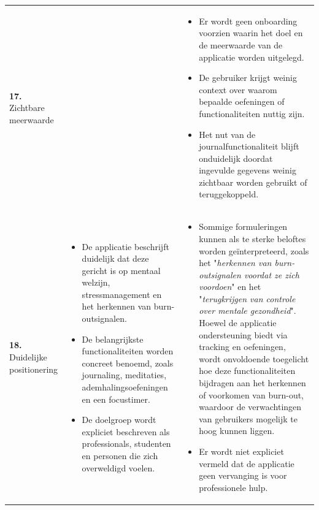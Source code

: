 {\begin{longtable}{
            >{\raggedright\arraybackslash}p{5.23cm}
            >{\raggedright\arraybackslash}p{4.93cm}
            >{\raggedright\arraybackslash}p{4.93cm}
        }
        \addlinespace[5pt]
        
        \textbf{17.} Zichtbare meerwaarde
        &
        & 
        \begin{itemize}[nosep,leftmargin=*,itemsep=10pt]
            \renewcommand{\labelitemi}{-}
            \item Er wordt geen onboarding voorzien waarin het doel en de meerwaarde van de applicatie worden uitgelegd.
            \item De gebruiker krijgt weinig context over waarom bepaalde oefeningen of functionaliteiten nuttig zijn.
            \item Het nut van de journalfunctionaliteit blijft onduidelijk doordat ingevulde gegevens weinig zichtbaar worden gebruikt of teruggekoppeld.
        \end{itemize}
        \\
        
        \addlinespace[5pt]
        
        \textbf{18.} Duidelijke positionering
        & 
        \begin{itemize}[nosep,leftmargin=*,itemsep=10pt]
            \renewcommand{\labelitemi}{+}
            \item De applicatie beschrijft duidelijk dat deze gericht is op mentaal welzijn, stressmanagement en het herkennen van burn-outsignalen.
            \item De belangrijkste functionaliteiten worden concreet benoemd, zoals journaling, meditaties, ademhalingsoefeningen en een focustimer.
            \item De doelgroep wordt expliciet beschreven als professionals, studenten en personen die zich overweldigd voelen.
        \end{itemize}
        & 
        \begin{itemize}[nosep,leftmargin=*,itemsep=10pt]
            \renewcommand{\labelitemi}{-}
            \item Sommige formuleringen kunnen als te sterke beloftes worden geïnterpreteerd, zoals het "\textit{herkennen van burn-outsignalen voordat ze zich voordoen}" en het "\textit{terugkrijgen van controle over mentale gezondheid}". Hoewel de applicatie ondersteuning biedt via tracking en oefeningen, wordt onvoldoende toegelicht hoe deze functionaliteiten bijdragen aan het herkennen of voorkomen van burn-out, waardoor de verwachtingen van gebruikers mogelijk te hoog kunnen liggen.
            \item Er wordt niet expliciet vermeld dat de applicatie geen vervanging is voor professionele hulp.
        \end{itemize}
        \\
        

\end{longtable}}
